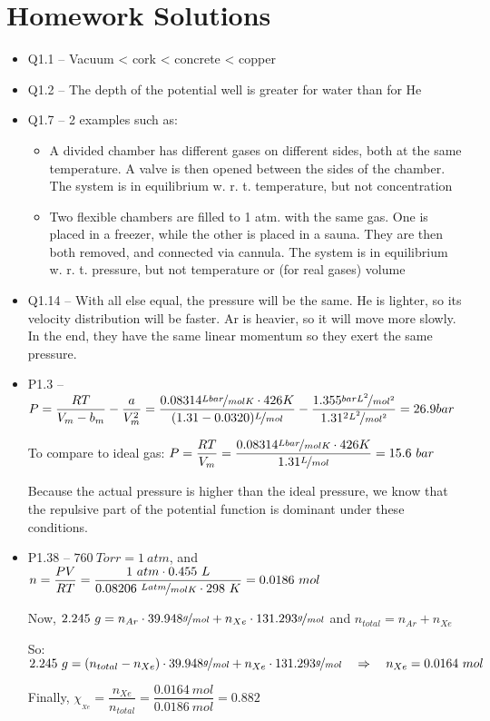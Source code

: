 \documentclass[12pt, openany, letterpaper]{memoir}
\begin{document}
\section*{Homework Solutions}
\begin{itemize}
	\item Q1.1 -- Vacuum < cork < concrete < copper
	\item Q1.2 -- The depth of the potential well is greater for water than for He
	\item Q1.7 -- 2 examples such as:
	\begin{itemize}
		\item A divided chamber has different gases on different sides, both at the same temperature. A valve is then opened  between the sides of the chamber. The system is in equilibrium w. r. t. temperature, but not concentration
		\item Two flexible chambers are filled to 1 atm. with the same gas. One is placed in a freezer, while the other is placed in a sauna. They are then both removed, and connected via cannula. The system is in equilibrium w. r. t. pressure, but not temperature or (for real gases) volume
	\end{itemize}
	\item Q1.14 -- With all else equal, the pressure will be the same. He is lighter, so its velocity distribution will be faster. Ar is heavier, so it will move more slowly. In the end, they have the same linear momentum so they exert the same pressure.
	\item P1.3 --  $P=\dfrac{RT}{V_m-b_m}-\dfrac{a}{V_m^2} = \dfrac{0.08314\nicefrac{Lbar}{molK}\cdot426K}{(1.31-0.0320)\nicefrac{L}{mol}}-\dfrac{1.355\nicefrac{barL^2}{mol^2}}{1.31^2\nicefrac{L^2}{mol^2}} = 26.9 bar$
	
	     To compare to ideal gas: $P=\dfrac{RT}{V_m} = \dfrac{0.08314\nicefrac{Lbar}{molK}\cdot426K}{1.31\nicefrac{L}{mol}} = 15.6~bar$
	     
	     Because the actual pressure is higher than the ideal pressure, we know that the repulsive part of the potential function is dominant under these conditions.
	\item P1.38 -- $760~Torr = 1~atm$, and $n = \dfrac{PV}{RT} = \dfrac{1~atm\cdot0.455~L}{0.08206~\nicefrac{Latm}{molK}\cdot298~K}=0.0186~mol$
	
	Now, $2.245~g = n_{Ar}\cdot39.948\nicefrac{g}{mol} + n_{Xe}\cdot131.293\nicefrac{g}{mol}$ and $n_{total} = n_{Ar} + n_{Xe}$
	
	So: $2.245~g = (n_{total}-n_{Xe})\cdot39.948\nicefrac{g}{mol} + n_{Xe}\cdot131.293\nicefrac{g}{mol} \hspace{1em}\Rightarrow\hspace{1em} n_{Xe} = 0.0164~mol$
	
	Finally, $\chi_{_{Xe}} = \dfrac{n_{Xe}}{n_{total}} = \dfrac{0.0164~mol}{0.0186~mol}= 0.882$
\end{itemize}
\end{document}
